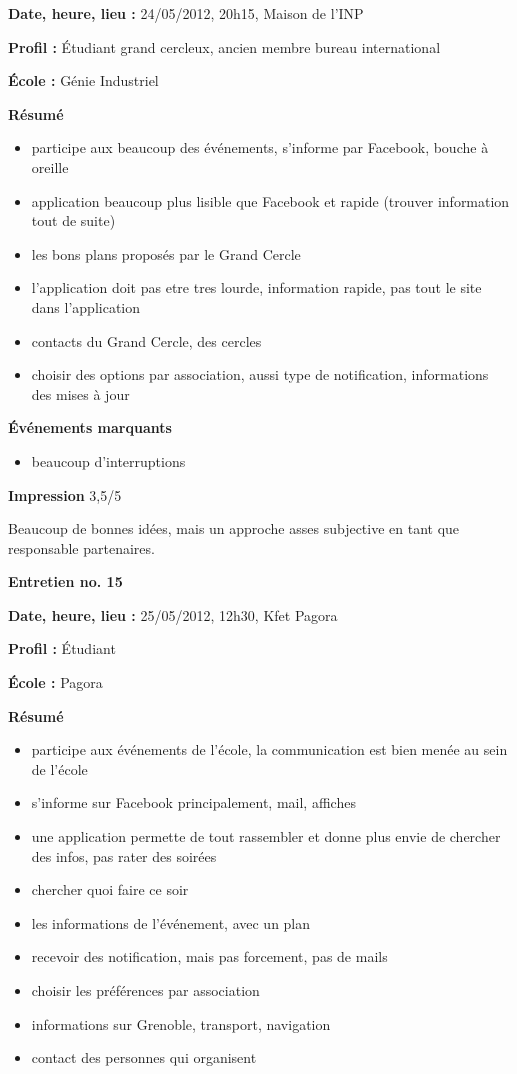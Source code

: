 \documentclass[a4paper, 11px]{article}
\begin{document}
\textbf{Date, heure, lieu : }
24/05/2012, 20h15, Maison de l'INP

\textbf{Profil : }
Étudiant grand cercleux, ancien membre bureau international

\textbf{École : }
Génie Industriel

\textbf{Résumé}
	\begin{itemize}
		\item participe aux beaucoup des événements, s'informe par Facebook, bouche à oreille
		\item application beaucoup plus lisible que Facebook et rapide (trouver information tout de suite)
		\item les bons plans proposés par le Grand Cercle
		\item l'application doit pas etre tres lourde, information rapide, pas tout le site dans l'application
		\item contacts du Grand Cercle, des cercles
		\item choisir des options par association, aussi type de notification, informations des mises à jour
	\end{itemize}

\textbf{Événements marquants}
	\begin{itemize}
		\item beaucoup d'interruptions
	\end{itemize}

\textbf{Impression}
3,5/5

Beaucoup de bonnes idées, mais un approche asses subjective en tant que responsable partenaires.



\vspace{.3cm}

 \textbf {\large Entretien no. 15}

\textbf{Date, heure, lieu : }
25/05/2012, 12h30, Kfet Pagora

\textbf{Profil : }
Étudiant 

\textbf{École : }
Pagora

\textbf{Résumé}
	\begin{itemize}
		\item participe aux événements de l'école, la communication est bien menée au sein de l'école 
		\item s'informe sur Facebook principalement, mail, affiches
		\item une application permette de tout rassembler et donne plus envie de chercher des infos, pas rater des soirées
		\item chercher quoi faire ce soir
		\item les informations de l'événement, avec un plan 
		\item recevoir des notification, mais pas forcement, pas de mails
		\item choisir les préférences par association
		\item informations sur Grenoble, transport, navigation
		\item contact des personnes qui organisent
	\end{itemize}
\end{document}
